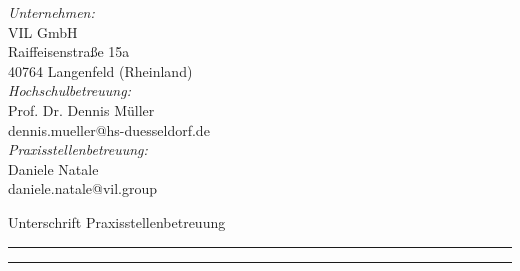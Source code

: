 \begin{titlepage}
\begin{center}
        \textit{Unternehmen:} \\
        VIL GmbH\\
        Raiffeisenstraße 15a \\
        40764 Langenfeld (Rheinland) \\[1cm]

        \textit{Hochschulbetreuung:} \\
        Prof. Dr. Dennis Müller\\
        dennis.mueller@hs-duesseldorf.de \\[1cm]

        \textit{Praxisstellenbetreuung:} \\
        Daniele Natale \\
        daniele.natale@vil.group
    \end{center}

    \vspace{3cm} %

    \begin{flushleft}
        Unterschrift Praxisstellenbetreuung
        \vspace{0.5in}

        \rule{0.3\textwidth}{0.4pt} \hspace{1cm} \rule{0.3\textwidth}{0.4pt}\\
         \hspace{1cm} 
    \end{flushleft}
\end{titlepage}

